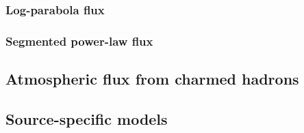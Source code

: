 \subsubsection{Log-parabola flux\label{sec:log_parabola}}
\begingroup
\graphicspath{{results/HESE_Final_Paper/}}

\endgroup

\subsubsection{Segmented power-law flux\label{sec:unfolding}}
\begingroup
\graphicspath{{results/HESE_Final_Paper/}}

\endgroup

\subsection{Atmospheric flux from charmed hadrons\label{sec:prompt}}
\begingroup
\graphicspath{{results/HESE_Final_Paper/}}

\endgroup

\subsection{Source-specific models\label{sec:specific_models}}
\begingroup
\graphicspath{{results/HESE_Final_Paper/}}

\endgroup